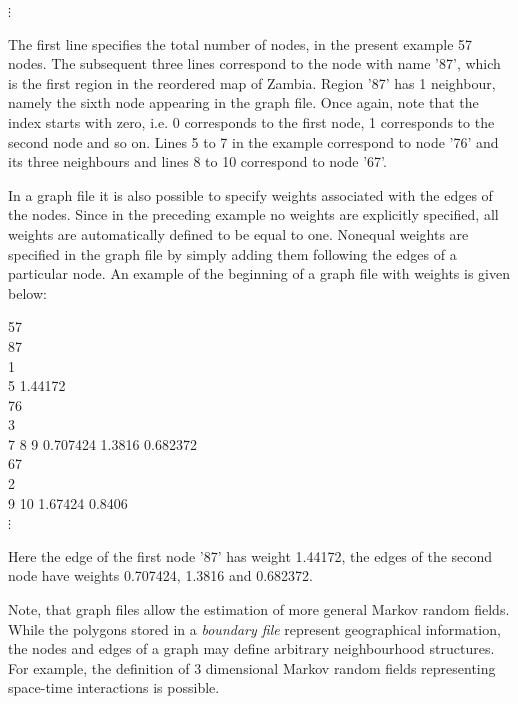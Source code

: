 \documentclass[a4paper]{article}
\begin{document}
\hspace{1cm} $\vdots$

\normalsize

\vspace{0.5cm}

The first line specifies the total number of nodes, in the present
example 57 nodes. The subsequent three lines correspond to the
node with name '87', which is the first region in the reordered
map of Zambia. Region '87' has 1 neighbour, namely the sixth node
appearing in the graph file. Once again, note that the index
starts with zero, i.e. 0 corresponds to the first node, 1
corresponds to the second node and so on. Lines 5 to 7 in the
example correspond to node '76' and its three neighbours and lines
8 to 10 correspond to node '67'.

In a graph file it is also possible to specify weights associated
with the edges of the nodes. Since in the preceding example no
weights are explicitly specified, all weights are automatically
defined to be equal to one. Nonequal weights are specified in the
graph file by simply adding them following the edges of a
particular node.
An example of the beginning of a graph file with weights is given below: \\

\footnotesize

 57\\
 87\\
 1\\
 5 1.44172\\
 76\\
 3\\
 7 8 9 0.707424 1.3816 0.682372\\
 67\\
 2\\
 9 10 1.67424 0.8406\\

\hspace{1cm} $\vdots$

\normalsize

\vspace{0.5cm}

Here the edge of the first node '87' has weight 1.44172, the edges
of the second node have weights 0.707424, 1.3816 and 0.682372.

Note, that graph files allow the estimation of more general Markov
random fields. While the polygons stored in a {\em boundary file}
represent geographical information, the nodes and edges of a graph
may define arbitrary neighbourhood structures. For example, the
definition of 3 dimensional Markov random fields representing
space-time interactions is possible.
\end{document}
